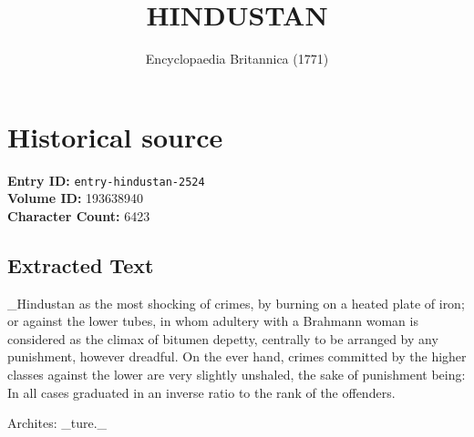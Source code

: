 \documentclass{article}
\title{HINDUSTAN}
\date{Encyclopaedia Britannica (1771)}
\begin{document}
\maketitle

\section*{Historical source}
\textbf{Entry ID:} \texttt{entry-hindustan-2524} \\
\textbf{Volume ID:} 193638940 \\
\textbf{Character Count:} 6423

\subsection*{Extracted Text}
\_Hindustan as the most shocking of crimes, by burning on a heated plate of iron; or against the lower tubes, in whom adultery with a Brahmann woman is considered as the climax of bitumen depetty, centrally to be arranged by any punishment, however dreadful. On the ever hand, crimes committed by the higher classes against the lower are very slightly unshaled, the sake of punishment being: In all cases graduated in an inverse ratio to the rank of the offenders.

Archites: \_ture.\_
\end{document}
